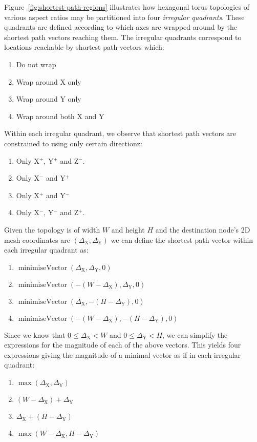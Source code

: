 			Figure~\ref{fig:shortest-path-regions} illustrates how hexagonal torus
			topologies of various aspect ratios may be partitioned into four
			\emph{irregular quadrants}. These quadrants are defined according to which
			axes are wrapped around by the shortest path vectors reaching them. The
			irregular quadrants correspond to locations reachable by shortest path
			vectors which:
			\begin{enumerate}
				\item Do not wrap
				\item Wrap around X only
				\item Wrap around Y only
				\item Wrap around both X and Y
			\end{enumerate}
			Within each irregular quadrant, we observe that shortest path vectors are
			constrained to using only certain directionz:
			\begin{enumerate}
				\item Only X$^+$, Y$^+$ and Z$^-$.
				\item Only X$^-$ and Y$^+$
				\item Only X$^+$ and Y$^-$
				\item Only X$^-$, Y$^-$ and Z$^+$.
			\end{enumerate}
			Given the topology is of width $W$ and height $H$ and the
			destination node's 2D mesh coordinates are $(\Delta_\textrm{X},
			\Delta_\textrm{Y})$ we can define the shortest path vector within each
			irregular quadrant as:
			\begin{enumerate}
				\item $\operatorname{minimiseVector}(\Delta_\textrm{X},\Delta_\textrm{Y},0)$
				\item $\operatorname{minimiseVector}(-(W-\Delta_\textrm{X}),\Delta_\textrm{Y},0)$
				\item $\operatorname{minimiseVector}(\Delta_\textrm{X},-(H-\Delta_\textrm{Y}),0)$
				\item $\operatorname{minimiseVector}(-(W-\Delta_\textrm{X}),-(H-\Delta_\textrm{Y}),0)$
			\end{enumerate}
			Since we know that $0 \le \Delta_\textrm{X} < W$ and $0 \le
			\Delta_\textrm{Y} < H$, we can simplify the expressions for the magnitude
			of each of the above vectors. This yields four expressions giving the
			magnitude of a minimal vector as if in each irregular quadrant:
			\begin{enumerate}
				\item $\operatorname{max}(\Delta_\textrm{X}, \Delta_\textrm{Y})$
				\item $(W - \Delta_\textrm{X}) + \Delta_\textrm{Y}$
				\item $\Delta_\textrm{X} + (H - \Delta_\textrm{Y})$
				\item $\operatorname{max}(W-\Delta_\textrm{X}, H-\Delta_\textrm{Y})$
			\end{enumerate}
